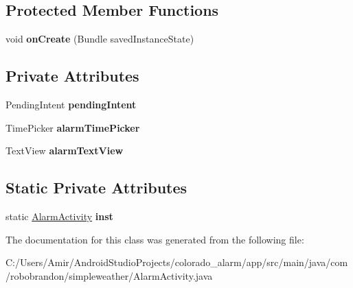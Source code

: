 \subsection*{Protected Member Functions}
\begin{DoxyCompactItemize}
\item 
void {\bfseries on\+Create} (Bundle saved\+Instance\+State)\hypertarget{classcom_1_1robobrandon_1_1simpleweather_1_1_alarm_activity_af2a8ca46bb30a0ad2bfa87f43cda7b64}{}\label{classcom_1_1robobrandon_1_1simpleweather_1_1_alarm_activity_af2a8ca46bb30a0ad2bfa87f43cda7b64}

\end{DoxyCompactItemize}
\subsection*{Private Attributes}
\begin{DoxyCompactItemize}
\item 
Pending\+Intent {\bfseries pending\+Intent}\hypertarget{classcom_1_1robobrandon_1_1simpleweather_1_1_alarm_activity_af48c1894df3be4b19244cbc7cc081edb}{}\label{classcom_1_1robobrandon_1_1simpleweather_1_1_alarm_activity_af48c1894df3be4b19244cbc7cc081edb}

\item 
Time\+Picker {\bfseries alarm\+Time\+Picker}\hypertarget{classcom_1_1robobrandon_1_1simpleweather_1_1_alarm_activity_a053ab29c0b7302964ceabe1d91cf1f28}{}\label{classcom_1_1robobrandon_1_1simpleweather_1_1_alarm_activity_a053ab29c0b7302964ceabe1d91cf1f28}

\item 
Text\+View {\bfseries alarm\+Text\+View}\hypertarget{classcom_1_1robobrandon_1_1simpleweather_1_1_alarm_activity_a29352fb3b8105b5703bf36ef938f33ad}{}\label{classcom_1_1robobrandon_1_1simpleweather_1_1_alarm_activity_a29352fb3b8105b5703bf36ef938f33ad}

\end{DoxyCompactItemize}
\subsection*{Static Private Attributes}
\begin{DoxyCompactItemize}
\item 
static \hyperlink{classcom_1_1robobrandon_1_1simpleweather_1_1_alarm_activity}{Alarm\+Activity} {\bfseries inst}\hypertarget{classcom_1_1robobrandon_1_1simpleweather_1_1_alarm_activity_aaa38485817f057c8bab7d74d020cf424}{}\label{classcom_1_1robobrandon_1_1simpleweather_1_1_alarm_activity_aaa38485817f057c8bab7d74d020cf424}

\end{DoxyCompactItemize}


The documentation for this class was generated from the following file\+:\begin{DoxyCompactItemize}
\item 
C\+:/\+Users/\+Amir/\+Android\+Studio\+Projects/colorado\+\_\+alarm/app/src/main/java/com/robobrandon/simpleweather/Alarm\+Activity.\+java\end{DoxyCompactItemize}
